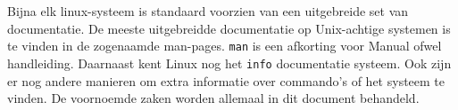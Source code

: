 Bijna elk linux-systeem is standaard voorzien van een uitgebreide set van documentatie. De meeste uitgebreidde documentatie op Unix-achtige systemen is te vinden in de zogenaamde man-pages. \texttt{man} is een afkorting voor Manual ofwel handleiding. Daarnaast kent Linux nog het \texttt{info} documentatie systeem. Ook zijn er nog andere manieren om extra informatie over commando's of het systeem te vinden. De voornoemde zaken worden allemaal in dit document behandeld.
